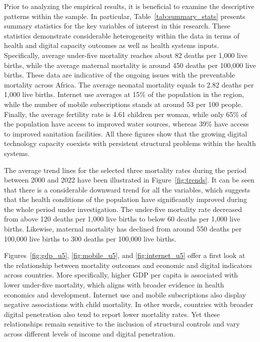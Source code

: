 \documentclass[12pt]{article}
\begin{document}
Prior to analyzing the empirical results, it is beneficial to examine the descriptive patterns within the sample. In particular, Table~\ref{tab:summary_stats} presents summary statistics for the key variables of interest in this research. These statistics demonstrate considerable heterogeneity within the data in terms of health and digital capacity outcomes as well as health systems inputs. Specifically, average under-five mortality reaches about 82 deaths per 1,000 live births, while the average maternal mortality is around 450 deaths per 100,000 live births. These data are indicative of the ongoing issues with the preventable mortality across Africa. The average neonatal mortality equals to 2.82 deaths per 1,000 live births. Internet use averages at 15\% of the population in the region, while the number of mobile subscriptions stands at around 53 per 100 people. Finally, the average fertility rate is 4.61 children per woman, while only 65\% of the population have access to improved water sources, whereas 39\% have access to improved sanitation facilities. All these figures show that the growing digital technology capacity coexists with persistent structural problems within the health systems.

The average trend lines for the selected three mortality rates during the period between 2000 and 2022 have been illustrated in Figure~\ref{fig:trends}. It can be seen that there is a considerable downward trend for all the variables, which suggests that the health conditions of the population have significantly improved during the whole period under investigation. The under-five mortality rate decreased from above 120 deaths per 1,000 live births to below 60 deaths per 1,000 live births. Likewise, maternal mortality has declined from around 550 deaths per 100,000 live births to 300 deaths per 100,000 live births.

\medskip
Figures~\ref{fig:gdp_u5}, \ref{fig:mobile_u5}, and \ref{fig:internet_u5} offer a first look at the relationship between mortality outcomes and economic and digital indicators across countries. More specifically, higher GDP per capita is associated with lower under-five mortality, which aligns with broader evidence in health economics and development. Internet use and mobile subscriptions also display negative associations with child mortality. In other words, countries with broader digital penetration also tend to report lower mortality rates. Yet these relationships remain sensitive to the inclusion of structural controls and vary across different levels of income and digital penetration.
\end{document}

